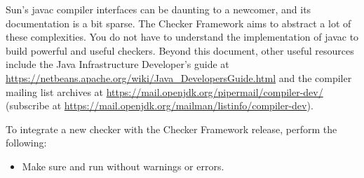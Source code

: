 
Sun's javac compiler interfaces can be daunting to a
newcomer, and its documentation is a bit sparse. The Checker Framework
aims to abstract a lot of these complexities.
You do not have to understand the implementation of javac to
build powerful and useful checkers.
Beyond this document,
other useful resources include the Java Infrastructure
Developer's guide at
\url{https://netbeans.apache.org/wiki/Java_DevelopersGuide.html} and the compiler
mailing list archives at
\url{https://mail.openjdk.org/pipermail/compiler-dev/}
(subscribe at
\url{https://mail.openjdk.org/mailman/listinfo/compiler-dev}).




To integrate a new checker with the Checker Framework release, perform
the following:

\begin{itemize}

\item Make sure  and  run
without warnings or errors.

\end{itemize}


